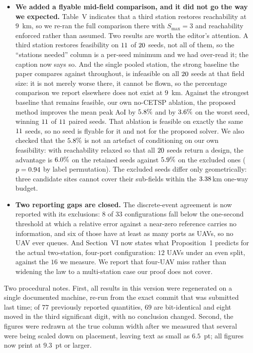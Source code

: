\documentclass[11pt]{article}
\begin{document}
\begin{itemize}
\item \textbf{We added a flyable mid-field comparison, and it did not go the way we
expected.} Table~V indicates that a third station restores reachability at $9$~km, so we
re-ran the full comparison there with $S_{\max}{=}3$ and reachability enforced rather than
assumed. Two results are worth the editor's attention. A third station restores
feasibility on $11$ of $20$ seeds, not all of them, so the ``stations
needed'' column is a per-seed minimum and we had over-read it; the caption now says so.
And the single pooled station, the strong baseline the paper compares against throughout,
is infeasible on all $20$ seeds at that field size: it is not merely worse there,
it cannot be flown, so the percentage comparison we report elsewhere does not exist at
$9$~km. Against the strongest baseline that remains feasible, our own no-CETSP ablation,
the proposed method improves the mean peak AoI by $5.8\%$ and by $3.6\%$ on
the worst seed, winning $11$ of $11$ paired seeds. That ablation is
feasible on exactly the same $11$ seeds, so no seed is flyable for it and not
for the proposed solver. We also checked that the $5.8\%$ is not an artefact of
conditioning on our own feasibility: with reachability relaxed so that all
$20$ seeds return a design, the advantage is $6.0\%$ on the retained
seeds against $5.9\%$ on the excluded ones ($p=0.94$ by label
permutation). The excluded seeds differ only geometrically: three candidate sites cannot
cover their sub-fields within the $3.38$\,km one-way budget.

\item \textbf{Two reporting gaps are closed.} The discrete-event agreement is now
reported with its exclusions: $8$ of $33$ configurations fall below the one-second
threshold at which a relative error against a near-zero reference carries no information,
and six of those have at least as many ports as UAVs, so no UAV ever queues. And
Section~VI now states what Proposition~1 predicts for the actual two-station,
four-port configuration: $12$ UAVs under an even split, against the $16$ we measure. We
report that four-UAV miss rather than widening the law to a multi-station case our proof
does not cover.

\end{itemize}

Two procedural notes. First, all results in this version were regenerated on a single
documented machine, re-run from the exact commit that was submitted last time; of
$77$ previously reported quantities, $69$ are bit-identical and eight moved in the
third significant digit, with no conclusion changed. Second, the figures were redrawn
at the true column width after we measured that several were being scaled down on
placement, leaving text as small as $6.5$~pt; all figures now print at
$9.3$~pt or larger.
\end{document}

